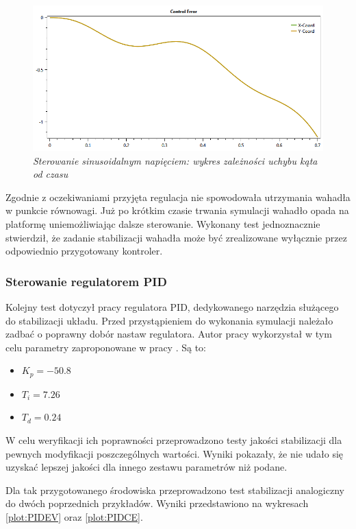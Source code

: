 \documentclass[12pt, oneside]{report}
\theoremstyle{definition}
\begin{document}
\begin{figure}[H]
	\centering
		\includegraphics[width = 350pt]{SinusoidalCE} 
		\caption{\textit{Sterowanie sinusoidalnym napięciem: wykres zależności uchybu kąta od czasu}}
		\label{plot:SinusoidalCE}
\end{figure}

Zgodnie z oczekiwaniami przyjęta regulacja nie spowodowała utrzymania wahadła w punkcie równowagi. Już po krótkim czasie trwania symulacji wahadło opada na platformę uniemożliwiając dalsze sterowanie. Wykonany test jednoznacznie stwierdził, że zadanie stabilizacji wahadła może być zrealizowane wyłącznie przez odpowiednio przygotowany kontroler.

\subsubsection{Sterowanie regulatorem PID}
Kolejny test dotyczył pracy regulatora PID, dedykowanego narzędzia służącego do stabilizacji układu. Przed przystąpieniem do wykonania symulacji należało zadbać o poprawny dobór nastaw regulatora. Autor pracy wykorzystał w tym celu parametry zaproponowane w pracy \cite{JTJT}. Są to:
\begin{itemize}
\item $K_p = -50.8$
\item $T_i = 7.26$
\item $T_d = 0.24$
\end{itemize}

W celu weryfikacji ich poprawności przeprowadzono testy jakości stabilizacji dla pewnych modyfikacji poszczególnych wartości. Wyniki pokazały, że nie udało się uzyskać lepszej jakości dla innego zestawu parametrów niż podane.

Dla tak przygotowanego środowiska przeprowadzono test stabilizacji analogiczny do dwóch poprzednich przykładów. Wyniki przedstawiono na wykresach \ref{plot:PIDEV} oraz  \ref{plot:PIDCE}.
\end{document}
